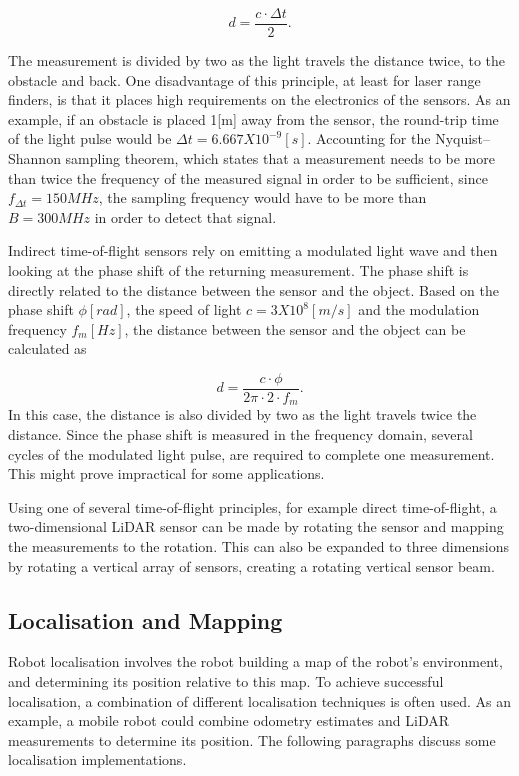 \begin{equation}\label{eq:TOF}
d = \frac{c \cdot \Delta t}{2}.
\end{equation}

The measurement is divided by two as the light travels the distance twice, to the obstacle and back. One disadvantage of this principle, at least for laser range finders, is that it places high requirements on the electronics of the sensors. As an example, if an obstacle is placed 1[m] away from the sensor, the round-trip time of the light pulse would be $\Delta t=6.667X10^{-9}[s]$. Accounting for the Nyquist–Shannon sampling theorem, which states that a measurement needs to be more than twice the frequency of the measured signal in order to be sufficient, since $f_{\Delta t}=150MHz$, the sampling frequency would have to be more than $B=300MHz$ in order to detect that signal. 

Indirect time-of-flight sensors rely on emitting a modulated light wave and then looking at the phase shift of the returning measurement. The phase shift is directly related to the distance between the sensor and the object. Based on the phase shift $\phi[rad]$, the speed of light $c=3X10^8[m/s]$ and the modulation frequency $f_m[Hz]$, the distance between the sensor and the object can be calculated as

\begin{equation}\label{eq:iTOF}
d = \frac{c \cdot \phi}{2\pi \cdot 2 \cdot f_m}.
\end{equation}
In this case, the distance is also divided by two as the light travels twice the distance. Since the phase shift is measured in the frequency domain, several cycles of the modulated light pulse, are required to complete one measurement. This might prove impractical for some applications.

Using one of several time-of-flight principles, for example direct time-of-flight, a two-dimensional LiDAR sensor can be made by rotating the sensor and mapping the measurements to the rotation. This can also be expanded to three dimensions by rotating a vertical array of sensors, creating a rotating vertical sensor beam.



\subsection{Localisation and Mapping}\label{sec:T:AN:Localisation}
Robot localisation involves the robot building a map of the robot's environment, and determining its position relative to this map\cite{SiegwartRoland2011Itam}.  To achieve successful localisation, a combination of different localisation techniques is often used. As an example, a mobile robot could combine odometry estimates and LiDAR measurements to determine its position. The following paragraphs discuss some localisation implementations.

